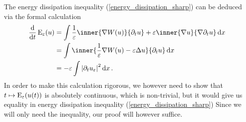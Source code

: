 \begin{remark}
	The energy dissipation inequality (\ref{energy_dissipation_sharp}) can be deduced via the formal calculation 
	\begin{align*}
		\dv{ t } \energy_{ \varepsilon } ( u )
		& =
		\int
			\frac{ 1 }{\varepsilon }
			\inner{ \nabla W ( u ) }{ \partial_{ t } u }
			+
			\varepsilon
			\inner{ \nabla u  }{ \nabla \partial_{ t } u }
		\dd{ x }
		\\
		& = 
		\int
			\inner{ \frac{ 1 }{ \varepsilon } \nabla W ( u ) - \varepsilon \Delta u }{ \partial_{ t } u }
		\dd{ x }
		\\
		& =
		- \varepsilon \int \abs{ \partial_{ t } u_{ \varepsilon } }^{ 2 } \dd{ x }.
	\end{align*}
	In order to make this calculation rigorous, we however need to show that $ t \mapsto \operatorname{E}_{ \varepsilon } ( u ( t ) ) $ is absolutely continuous, which is non-trivial, but it would give us equality in energy dissipation inequality (\ref{energy_dissipation_sharp})
	Since we will only need the inequality, our proof will however suffice.
\end{remark}








